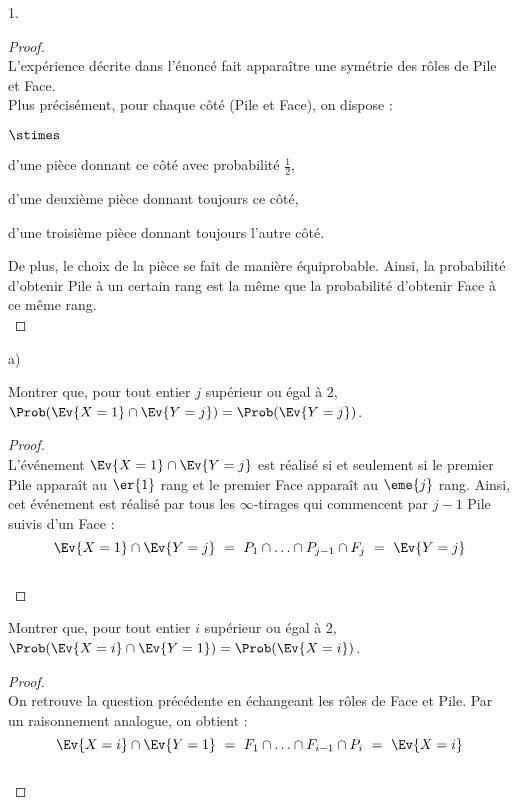 \documentclass[11pt]{article}%
\begin{document}
\begin{noliste}{1.}
  \begin{proof}~\\%
    L'expérience décrite dans l'énoncé fait apparaître une symétrie
    des rôles de Pile et Face.\\
    Plus précisément, pour chaque côté (Pile et Face), on dispose :
    \begin{noliste}{$\stimes$}
    \item d'une pièce donnant ce côté avec probabilité $\frac{1}{2}$,
    \item d'une deuxième pièce donnant toujours ce côté,
    \item d'une troisième pièce donnant toujours l'autre côté.
    \end{noliste}
    De plus, le choix de la pièce se fait de manière
    équiprobable. Ainsi, la probabilité d'obtenir Pile à un certain
    rang est la même que la probabilité d'obtenir Face à ce même
    rang.%
    ~\\[-1cm]
  \end{proof}

\item
  \begin{noliste}{a)}
    \setlength{\itemsep}{2mm}
  \item Montrer que, pour tout entier $j$ supérieur ou égal à $2$,
    $\Prob(\Ev{X = 1} \cap \Ev{Y = j}) = \Prob(\Ev{Y = j})$.

    \begin{proof}~\\%
      L'événement $\Ev{X = 1} \cap \Ev{Y = j}$ est réalisé si et
      seulement si le premier Pile apparaît au $\er{1}$ rang et le
      premier Face apparaît au $\eme{j}$ rang. Ainsi, cet événement
      est réalisé par tous les $\infty$-tirages qui commencent par
      $j-1$ Pile suivis d'un Face :
      \[
      \Ev{X = 1} \cap \Ev{Y = j} \ = \ P_1 \cap \ldots \cap P_{j-1}
      \cap F_j \ = \ \Ev{Y = j}
      \]
      ~\\[-1cm]
    \end{proof}

  \item Montrer que, pour tout entier $i$ supérieur ou égal à $2$,
    $\Prob(\Ev{X = i} \cap \Ev{Y = 1}) = \Prob(\Ev{X = i})$.

    \begin{proof}~\\%
      On retrouve la question précédente en échangeant les rôles de
      Face et Pile. Par un raisonnement analogue, on obtient :
      \[
      \Ev{X = i} \cap \Ev{Y = 1} \ = \ F_1 \cap \ldots \cap F_{i-1}
      \cap P_i \ = \ \Ev{X = i}
      \]
      ~\\[-1cm]
    \end{proof}
  \end{noliste}


\end{noliste}
\end{document}
